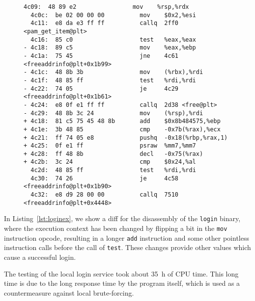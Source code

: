 \begin{figure}
\begin{minipage}{\linewidth}
\begin{lstlisting}[style=diff,
                   caption={Diff for the disassembly after an exploitable
bitflip was applied to the \texttt{login} binary in order to bypass the
credential check. Changing the instruction for \texttt{mov} to an \texttt{add}
with addressing modes sets changes the execution calls until the \texttt{test}
instruction is called. These changes affect register values and the outcome of
the program.},
label=lst:loginex]
  4c09:  48 89 e2                mov    %rsp,%rdx
  4c0c:  be 02 00 00 00          mov    $0x2,%esi
  4c11:  e8 da e3 ff ff          callq  2ff0 <pam_get_item@plt>
  4c16:  85 c0                   test   %eax,%eax
- 4c18:  89 c5                   mov    %eax,%ebp
- 4c1a:  75 45                   jne    4c61 <freeaddrinfo@plt+0x1b99>
- 4c1c:  48 8b 3b                mov    (%rbx),%rdi
- 4c1f:  48 85 ff                test   %rdi,%rdi
- 4c22:  74 05                   je     4c29 <freeaddrinfo@plt+0x1b61>
- 4c24:  e8 0f e1 ff ff          callq  2d38 <free@plt>
- 4c29:  48 8b 3c 24             mov    (%rsp),%rdi
+ 4c18:  81 c5 75 45 48 8b       add    $0x8b484575,%ebp
+ 4c1e:  3b 48 85                cmp    -0x7b(%rax),%ecx
+ 4c21:  ff 74 05 e8             pushq  -0x18(%rbp,%rax,1)
+ 4c25:  0f e1 ff                psraw  %mm7,%mm7
+ 4c28:  ff 48 8b                decl   -0x75(%rax)
+ 4c2b:  3c 24                   cmp    $0x24,%al
  4c2d:  48 85 ff                test   %rdi,%rdi
  4c30:  74 26                   je     4c58 <freeaddrinfo@plt+0x1b90>
  4c32:  e8 d9 28 00 00          callq  7510 <freeaddrinfo@plt+0x4448>
\end{lstlisting}
\end{minipage}
\end{figure}

In Listing~\ref{lst:loginex}, we show a diff for the disassembly of the
\texttt{login} binary, where the execution context has been changed by flipping
a bit in the \texttt{mov} instruction opcode, resulting in a longer
\texttt{add} instruction and some other pointless instruction calls before the
call of \texttt{test}. These changes provide other values which cause a
successful login.

The testing of the local login service took about \SI{35}{\hour} of CPU time.
This long time is due to the long response time by the program itself, which is
used as a countermeasure against local brute-forcing.

